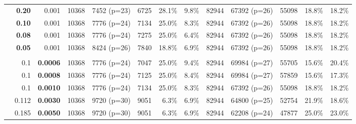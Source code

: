 \begin{table*}
{\begin{tabular}{l|rr|rrrrr|rrrrr}
    & \textbf{0.20} & 0.001  & 10368 & 7452 (p=23) & 6725 & 28.1\% & 9.8\% & 82944 & 67392 (p=26) & 55098 & 18.8\% & 18.2\% \\
    
    & \textbf{0.10} & 0.001  & 10368 & 7776 (p=24) & 7134 & 25.0\% & 8.3\% & 82944 & 67392 (p=26) & 55098 & 18.8\% & 18.2\% \\
    
    & \textbf{0.08} & 0.001  & 10368 & 7776 (p=24) & 7275 & 25.0\% & 6.4\% & 82944 & 67392 (p=26) & 55098 & 18.8\% & 18.2\% \\
    
    & \textbf{0.05} & 0.001  & 10368 & 8424 (p=26) & 7840 & 18.8\% & 6.9\% & 82944 & 67392 (p=26) & 55098 & 18.8\% & 18.2\% \\
    
    & & & & & & & & & & & &\\
    
    & 0.1 & \textbf{0.0006}  & 10368 & 7776 (p=24) & 7047 & 25.0\% & 9.4\% & 82944 & 69984 (p=27) & 55705 & 15.6\% & 20.4\% \\
    
    & 0.1 & \textbf{0.0008}  & 10368 & 7776 (p=24) & 7125 & 25.0\% & 8.4\% & 82944 & 69984 (p=27) & 57859 & 15.6\% & 17.3\% \\
    
    & 0.1 & \textbf{0.0010}  & 10368 & 7776 (p=24) & 7134 & 25.0\% & 8.3\% & 82944 & 67392 (p=26) & 55098 & 18.8\% & 18.2\% \\
    
    & 0.112 & \textbf{0.0030}  & 10368 &  9720 (p=30) & 9051 & 6.3\% & 6.9\% & 82944 & 64800 (p=25) & 52754 & 21.9\% & 18.6\% \\
    
    & 0.185 &\textbf{0.0050}  & 10368 & 9720 (p=30) & 9051 & 6.3\% & 6.9\% & 82944 & 62208 (p=24) & 47877 & 25.0\%& 23.0\% \\
    \bottomrule
  \end{tabular}}
\end{table*}